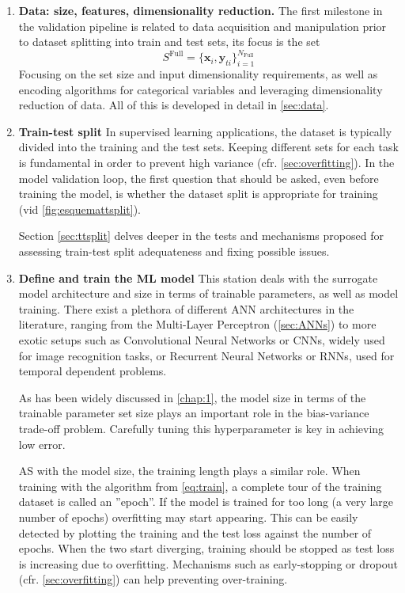 \begin{enumerate}
	\item\label{item:data}\textbf{Data: size, features, dimensionality reduction.}
	The first milestone in the validation pipeline is related to data acquisition and manipulation prior to dataset splitting into train and test sets, \ie its focus is the set
	$$
	S^\text{Full}=\{\mathbf{x}_i,\mathbf{y}_{ti}\}_{i=1}^{N_{\text{Full}}}
	$$
	Focusing on the set size and input dimensionality requirements, as well as encoding algorithms for categorical variables and leveraging dimensionality reduction of data. All of this is developed in detail in \autoref{sec:data}.
	
	\item\label{item:tt_split}\textbf{Train-test split}
	\indent In supervised learning applications, the dataset is typically divided into the training and the test sets. Keeping different sets for each task is fundamental in order to prevent high variance (cfr. \autoref{sec:overfitting}). In the model validation loop, the first question that should be asked, even before training the model, is whether the dataset split is appropriate for training (vid \autoref{fig:esquemattsplit}).
	
	Section \ref{sec:ttsplit} delves deeper in the tests and mechanisms proposed for assessing train-test split adequateness and fixing possible issues.
	
	\item\label{item:defineettrain}\textbf{Define and train the ML model}
	This station deals with the surrogate model architecture and size in terms of trainable parameters, as well as model training. There exist a plethora of different ANN architectures in the literature, ranging from the Multi-Layer Perceptron (\autoref{sec:ANNs}) to more exotic setups such as Convolutional Neural Networks or CNNs\cite{li2021survey}, widely used for image recognition tasks, or Recurrent Neural Networks or RNNs\cite{medsker2001recurrent}, used for temporal dependent problems.
	
	As has been widely discussed in \autoref{chap:1}, the model size in terms of the trainable parameter set size plays an important role in the bias-variance trade-off problem. Carefully tuning this hyperparameter is key in achieving low error.
	
	AS with the model size, the training length plays a similar role. When training with the algorithm from \cref{eq:train}, a complete tour of the training dataset is called an ''epoch''. If the model is trained for too long (a very large number of epochs) overfitting may start appearing. This can be easily detected by plotting the training and the test loss against the number of epochs. When the two start diverging, training should be stopped as test loss is increasing due to overfitting. Mechanisms such as early-stopping\cite{prechelt2002early} or dropout (cfr. \autoref{sec:overfitting}) can help preventing over-training.
	

\end{enumerate}
